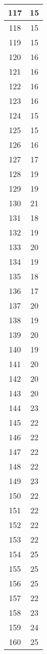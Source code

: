 \documentclass[letterpaper, 12pt]{article}
\begin{document}
\begin{longtable}{|c|c|}
\hline
117 & 15 \\
\hline
118 & 15 \\
\hline
119 & 15 \\
\hline
120 & 16 \\
\hline
121 & 16 \\
\hline
122 & 16 \\
\hline
123 & 16 \\
\hline
124 & 15 \\
\hline
125 & 15 \\
\hline
126 & 16 \\
\hline
127 & 17 \\
\hline
128 & 19 \\
\hline
129 & 19 \\
\hline
130 & 21 \\
\hline
131 & 18 \\
\hline
132 & 19 \\
\hline
133 & 20 \\
\hline
134 & 19 \\
\hline
135 & 18 \\
\hline
136 & 17 \\
\hline
137 & 20 \\
\hline
138 & 19 \\
\hline
139 & 20 \\
\hline
140 & 19 \\
\hline
141 & 20 \\
\hline
142 & 20 \\
\hline
143 & 20 \\
\hline
144 & 23 \\
\hline
145 & 22 \\
\hline
146 & 22 \\
\hline
147 & 22 \\
\hline
148 & 22 \\
\hline
149 & 23 \\
\hline
150 & 22 \\
\hline
151 & 22 \\
\hline
152 & 22 \\
\hline
153 & 22 \\
\hline
154 & 25 \\
\hline
155 & 25 \\
\hline
156 & 25 \\
\hline
157 & 22 \\
\hline
158 & 23 \\
\hline
159 & 24 \\
\hline
160 & 25 \\
\hline

\end{longtable}
\end{document}
